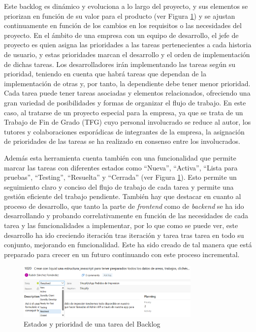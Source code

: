 \documentclass[11pt]{article}
\begin{document}
Este backlog es dinámico y evoluciona a lo largo del proyecto, y sus elementos se priorizan en función de su valor para el 
producto (ver Figura \ref{fig:4}) y se ajustan continuamente en función de los cambios en los requisitos o las necesidades del proyecto. En el ámbito de una empresa con
un equipo de desarrollo, el jefe de proyecto es quien asigna las prioridades a las tareas pertenecientes a cada historia de usuario, y estas prioridades marcan
el desarrollo y el orden de implementación de dichas tareas. Los desarrolladores irán implementando las tareas según su prioridad, 
teniendo en cuenta que habrá tareas que dependan de la implementación de otras y, por tanto, la dependiente debe tener menor prioridad.
Cada tarea puede tener tareas asociadas y elementos relacionados, ofreciendo una gran variedad de posibilidades y formas de organizar el flujo de trabajo. 
En este caso, al tratarse de un proyecto especial para la empresa, ya que se trata de un Trabajo de Fin de Grado (TFG) 
cuyo personal involucrado se reduce al autor, los tutores y colaboraciones esporádicas de integrantes de la empresa, la asignación de prioridades 
de las tareas se ha realizado en consenso entre los involucrados.

Además esta herramienta cuenta también con una funcionalidad que permite marcar las tareas con diferentes estados como ``Nueva'', ``Activa'', ``Lista para pruebas'', ``Testing'', ``Resuelta'' y ``Cerrada'' (ver Figura \ref{fig:4}). Esto permite un seguimiento claro y conciso del flujo de trabajo de cada tarea
y permite una gestión eficiente del trabajo pendiente. También hay que destacar en cuanto al proceso de desarrollo, que tanto la parte de \textit{frontend} como de \textit{backend} se ha ido desarrollando y probando correlativamente en función de las necesidades de cada tarea y las funcionalidades a implementar, por lo que como se puede ver, 
este desarrollo ha ido creciendo iteración tras iteración y tarea tras tarea en todo su conjunto, mejorando en funcionalidad. Este ha sido creado de tal manera que está preparado para crecer en un futuro continuando con este proceso incremental.


\begin{figure}[H]
    \centering
    \includegraphics[width=0.8\textwidth]{imagenes/Estados y prioridad de tarea.png}
    \caption{\label{fig:4}Estados y prioridad de una tarea del Backlog}
    \vspace{\fill}
\end{figure}
\end{document}
